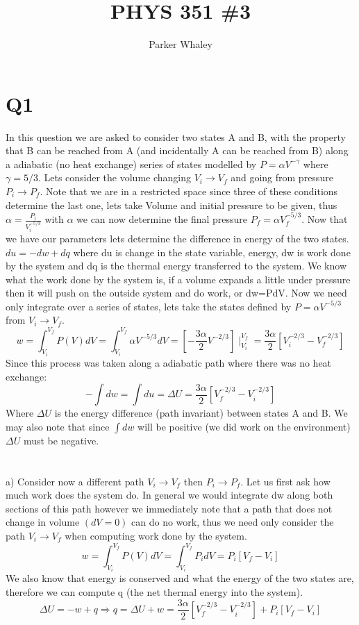 \documentclass[10pt,a4paper]{article}
\author{Parker Whaley}
\title{PHYS 351 \#3}
\begin{document}
\maketitle

\section{Q1}
In this question we are asked to consider two states A and B, with the property that B can be reached from A (and incidentally A can be reached from B) along a adiabatic (no heat exchange) series of states modelled by \(P=\alpha V^{-\gamma}\) where \(\gamma=5/3\).  Lets consider the volume changing \(V_{i}\rightarrow V_{f}\) and going from pressure \(P_{i}\rightarrow P_{f}\).  Note that we are in a restricted space since three of these conditions determine the last one, lets take Volume and initial pressure to be given, thus \(\alpha=\frac{P_{i}}{V_{i}^{-5/3}}\) with \(\alpha\) we can now determine the final pressure \(P_{f}=\alpha V_{f}^{-5/3}\).  Now that we have our parameters lets determine the difference in energy of the two states.  \(du=-dw+dq\) where du is change in the state variable, energy, dw is work done by the system and dq is the thermal energy transferred to the system.  We know what the work done by the system is, if a volume expands a little under pressure then it will push on the outside system and do work, or dw=PdV.  Now we need only integrate over a series of states, lets take the states defined by \(P=\alpha V^{-5/3}\) from \(V_{i}\rightarrow V_{f}\). \[w=\int_{V_{i}}^{V_{f}}P(V)dV=\int_{V_{i}}^{V_{f}}\alpha V^{-5/3}dV=[-\frac{3\alpha}{2} V^{-2/3}]\mid_{V_{i}}^{V_{f}}=\frac{3\alpha}{2}[V_{i}^{-2/3}-V_{f}^{-2/3}]\] Since this process was taken along a adiabatic path where there was no heat exchange: \[-\int dw=\int du= \Delta U = \frac{3\alpha}{2}[V_{f}^{-2/3}-V_{i}^{-2/3}]\] Where $\Delta U$ is the energy difference (path invariant) between states A and B.  We may also note that since \(\int dw\) will be positive (we did work on the environment) $\Delta U$ must be negative.\\\\\\

a)  Consider now a different path \(V_{i}\rightarrow V_{f}\) then \(P_{i}\rightarrow P_{f}\).  Let us first ask how much work does the system do.  In general we would integrate dw along both sections of this path however we immediately note that a path that does not change in volume \((dV=0)\) can do no work, thus we need only consider the path \(V_{i}\rightarrow V_{f}\) when computing work done by the system.\[w=\int_{V_{i}}^{V_{f}}P(V)dV=\int_{V_{i}}^{V_{f}}P_{i}dV=P_{i}[V_{f}-V_{i}]\] We also know that energy is conserved and what the energy of the two states are, therefore we can compute q (the net thermal energy into the system).\[\Delta U=-w+q\Rightarrow q=\Delta U+w=\frac{3\alpha}{2}[V_{f}^{-2/3}-V_{i}^{-2/3}]+P_{i}[V_{f}-V_{i}]\]\\\\\\
\end{document}
